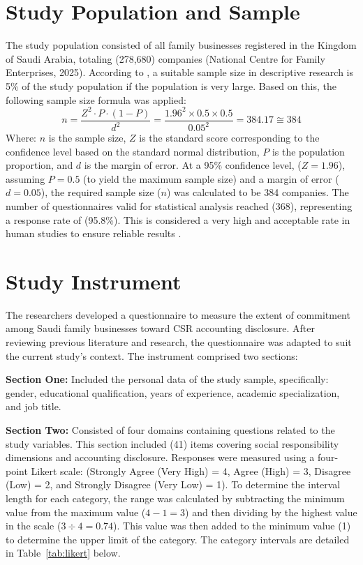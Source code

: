 \documentclass{NSP1}
\begin{document}
\section{Study Population and Sample}
The study population consisted of all family businesses registered in the Kingdom of Saudi Arabia, totaling (278,680) companies (National Centre for Family Enterprises, 2025). According to \cite{ref33}, a suitable sample size in descriptive research is 5\% of the study population if the population is very large. Based on this, the following sample size formula was applied:
\begin{equation}
n=\frac{Z^{2}\cdot P\cdot\left(1-P\right)}{d^{2}}
 =\frac{1.96^{2}\times 0.5\times 0.5}{0.05^{2}}
 =384.17\cong 384
\label{eq:sample}
\end{equation}
Where: $n$ is the sample size, $Z$ is the standard score corresponding to the confidence level based on the standard normal distribution, $P$ is the population proportion, and $d$ is the margin of error. At a 95\% confidence level, ($Z = 1.96$), assuming $P = 0.5$ (to yield the maximum sample size) and a margin of error ($d = 0.05$), the required sample size ($n$) was calculated to be 384 companies. The number of questionnaires valid for statistical analysis reached (368), representing a response rate of (95.8\%). This is considered a very high and acceptable rate in human studies to ensure reliable results \cite{ref34}.

\section{Study Instrument}
The researchers developed a questionnaire to measure the extent of commitment among Saudi family businesses toward CSR accounting disclosure. After reviewing previous literature and research, the questionnaire was adapted to suit the current study's context. The instrument comprised two sections:

\textbf{Section One:} Included the personal data of the study sample, specifically: gender, educational qualification, years of experience, academic specialization, and job title.

\textbf{Section Two:} Consisted of four domains containing questions related to the study variables. This section included (41) items covering social responsibility dimensions and accounting disclosure. Responses were measured using a four-point Likert scale: (Strongly Agree (Very High) = 4, Agree (High) = 3, Disagree (Low) = 2, and Strongly Disagree (Very Low) = 1). To determine the interval length for each category, the range was calculated by subtracting the minimum value from the maximum value ($4 - 1 = 3$) and then dividing by the highest value in the scale ($3 \div 4 = 0.74$). This value was then added to the minimum value (1) to determine the upper limit of the category. The category intervals are detailed in Table~\ref{tab:likert} below.
\end{document}
